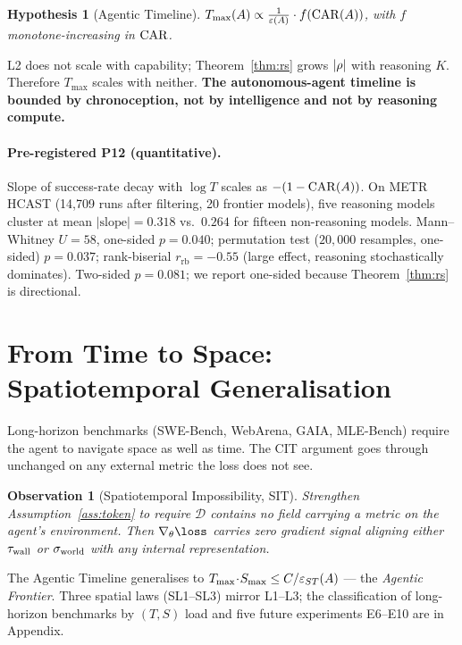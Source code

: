 \documentclass{article}
\newtheorem{observation}{Observation}
\newtheorem{hypothesis}{Hypothesis}
\begin{document}
\begin{hypothesis}[Agentic Timeline]\label{hyp:at}
$T_{\max}(A) \propto \frac{1}{\varepsilon(A)}\cdot f(\mathrm{CAR}(A))$, with $f$ monotone-increasing in $\mathrm{CAR}$.
\end{hypothesis}

L2 does not scale with capability; Theorem~\ref{thm:rs} grows $|\rho|$ with reasoning $K$. Therefore $T_{\max}$ scales with neither. \textbf{The autonomous-agent timeline is bounded by chronoception, not by intelligence and not by reasoning compute.}

\paragraph{Pre-registered P12 (quantitative).} Slope of success-rate decay with $\log T$ scales as $-(1-\mathrm{CAR}(A))$. On METR HCAST (14{,}709 runs after filtering, 20 frontier models), five reasoning models cluster at mean $|\text{slope}| = 0.318$ vs.\ $0.264$ for fifteen non-reasoning models. Mann--Whitney $U = 58$, one-sided $p = 0.040$; permutation test ($20{,}000$ resamples, one-sided) $p = 0.037$; rank-biserial $r_{\text{rb}} = -0.55$ (large effect, reasoning stochastically dominates). Two-sided $p = 0.081$; we report one-sided because Theorem~\ref{thm:rs} is directional.

\section{From Time to Space: Spatiotemporal Generalisation}\label{sec:sit}

Long-horizon benchmarks (SWE-Bench, WebArena, GAIA, MLE-Bench) require the agent to navigate space as well as time. The CIT argument goes through unchanged on any external metric the loss does not see.

\begin{observation}[Spatiotemporal Impossibility, SIT]\label{thm:sit}
Strengthen Assumption~\ref{ass:token} to require $\mathcal{D}$ contains no field carrying a metric on the agent's environment. Then $\nabla_\theta\loss$ carries zero gradient signal aligning either $\tau_{\mathrm{wall}}$ or $\sigma_{\mathrm{world}}$ with any internal representation.
\end{observation}

The Agentic Timeline generalises to $T_{\max}\!\cdot\!S_{\max} \leq C / \varepsilon_{ST}(A)$ --- the \emph{Agentic Frontier}. Three spatial laws (SL1--SL3) mirror L1--L3; the classification of long-horizon benchmarks by $(T, S)$ load and five future experiments E6--E10 are in Appendix.
\end{document}
